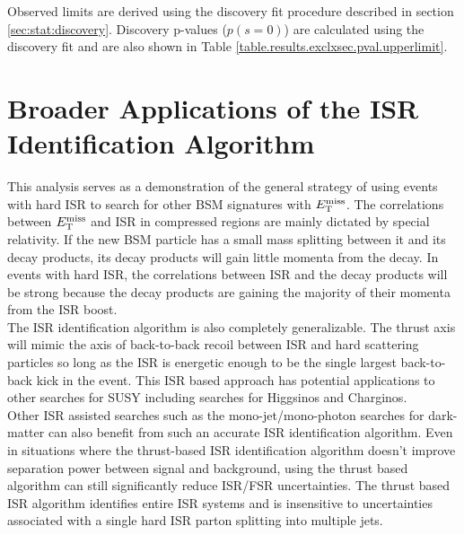 \indent Observed limits are derived using the discovery fit procedure described in section \ref{sec:stat:discovery}.  Discovery p-values ($p(s=0)$) are calculated using the discovery fit and are also shown in Table \ref{table.results.exclxsec.pval.upperlimit}.  \\





\section{Broader Applications of the ISR Identification Algorithm}

\indent This analysis serves as a demonstration of the general strategy of using events with hard ISR to search for other BSM signatures with $E_{\mathrm{T}}^{\mathrm{miss}}$.  The correlations between $E_{\mathrm{T}}^{\mathrm{miss}}$ and ISR in compressed regions are mainly dictated by special relativity.  If the new BSM particle has a small mass splitting between it and its decay products, its decay products will gain little momenta from the decay.  In events with hard ISR, the correlations between ISR and the decay products will be strong because the decay products are gaining the majority of their momenta from the ISR boost. \\

\indent The ISR identification algorithm is also completely generalizable.  The thrust axis will mimic the axis of back-to-back recoil between ISR and hard scattering particles so long as the ISR is energetic enough to be the single largest back-to-back kick in the event.  This ISR based approach has potential applications to other searches for SUSY including searches for Higgsinos and Charginos.  \\

\indent Other ISR assisted searches such as the mono-jet/mono-photon searches for dark-matter can also benefit from such an accurate ISR identification algorithm.  Even in situations where the thrust-based ISR identification algorithm doesn't improve separation power between signal and background, using the thrust based algorithm can still significantly reduce ISR/FSR uncertainties.  The thrust based ISR algorithm identifies entire ISR systems and is insensitive to uncertainties associated with a single hard ISR parton splitting into multiple jets. \\

